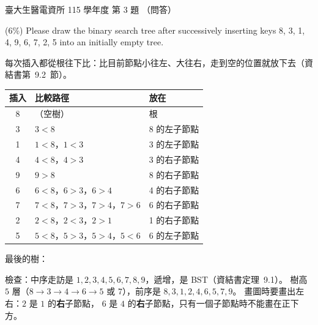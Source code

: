 \begin{pastexam}[label={px:ntu-115-bmei-alg-03}]{臺大生醫電資所 115 學年度 第 3 題}
（問答）

(6\%) Please draw the binary search tree after successively inserting keys 8, 3, 1, 4, 9, 6, 7, 2, 5
into an initially empty tree.
\end{pastexam}

\begin{pastsoln}
每次插入都從根往下比：比目前節點小往左、大往右，走到空的位置就放下去（資結書第~9.2~節）。
\begin{center}
\small
\begin{tabular}{cll}
\toprule
插入 & 比較路徑 & 放在 \\
\midrule
8 & （空樹） & 根 \\
3 & $3 < 8$ & 8 的左子節點 \\
1 & $1 < 8$，$1 < 3$ & 3 的左子節點 \\
4 & $4 < 8$，$4 > 3$ & 3 的右子節點 \\
9 & $9 > 8$ & 8 的右子節點 \\
6 & $6 < 8$，$6 > 3$，$6 > 4$ & 4 的右子節點 \\
7 & $7 < 8$，$7 > 3$，$7 > 4$，$7 > 6$ & 6 的右子節點 \\
2 & $2 < 8$，$2 < 3$，$2 > 1$ & 1 的右子節點 \\
5 & $5 < 8$，$5 > 3$，$5 > 4$，$5 < 6$ & 6 的左子節點 \\
\bottomrule
\end{tabular}
\end{center}
最後的樹：
\begin{center}
\end{center}
檢查：中序走訪是 $1, 2, 3, 4, 5, 6, 7, 8, 9$，遞增，是 BST（資結書定理~9.1）。 樹高 $5$ 層（$8 \to 3 \to
4 \to 6 \to 5$ 或 $7$），前序是 $8, 3, 1, 2, 4, 6, 5, 7, 9$。 畫圖時要畫出左右：$2$ 是 $1$ 的\textbf{右}子節點，
$6$ 是 $4$ 的\textbf{右}子節點，只有一個子節點時不能畫在正下方。
\end{pastsoln}
